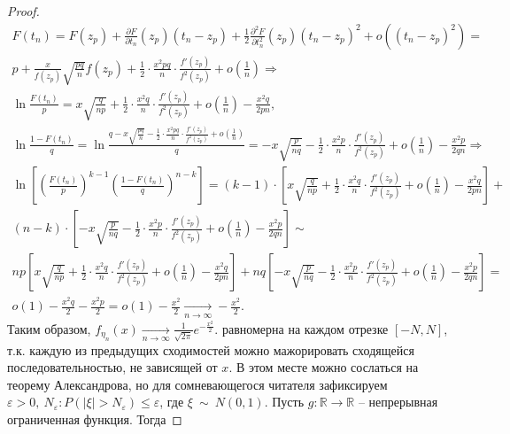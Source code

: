 \begin{proof}
\begin{gather*}
F( t_{n}) =F( z_{p}) +\frac{\partial F}{\partial t_{n}}( z_{p})( t_{n} -z_{p}) +\frac{1}{2}\frac{\partial ^{2} F}{\partial t_{n}^{2}}( z_{p})( t_{n} -z_{p})^{2} +o\left(( t_{n} -z_{p})^{2}\right) =\\ p+\frac{x}{f( z_{p})}\sqrt{\frac{pq}{n}} f( z_{p}) +\frac{1}{2} \cdotp \frac{x^{2} pq}{n} \cdotp \frac{f'( z_{p})}{f^{2}( z_{p})} +o\left(\frac{1}{n}\right) \Rightarrow \\
\ln\frac{F( t_{n})}{p} =x\sqrt{\frac{q}{np}} +\frac{1}{2} \cdotp \frac{x^{2} q}{n} \cdotp \frac{f'( z_{p})}{f^{2}( z_{p})} +o\left(\frac{1}{n}\right) -\frac{x^{2} q}{2pn} ,\\
\ln\frac{1-F( t_{n})}{q} =\ln\frac{q-x\sqrt{\frac{pq}{n}} -\frac{1}{2} \cdotp \frac{x^{2} pq}{n} \cdotp \frac{f'( z_{p})}{f^{2}( z_{p})} +o\left(\frac{1}{n}\right)}{q} =-x\sqrt{\frac{p}{nq}} -\frac{1}{2} \cdotp \frac{x^{2} p}{n} \cdotp \frac{f'( z_{p})}{f^{2}( z_{p})} +o\left(\frac{1}{n}\right) -\frac{x^{2} p}{2qn} \Rightarrow \\
\ln\left[\left(\frac{F( t_{n})}{p}\right)^{k-1}\left(\frac{1-F( t_{n})}{q}\right)^{n-k}\right] =( k-1) \cdotp \left[ x\sqrt{\frac{q}{np}} +\frac{1}{2} \cdotp \frac{x^{2} q}{n} \cdotp \frac{f'( z_{p})}{f^{2}( z_{p})} +o\left(\frac{1}{n}\right) -\frac{x^{2} q}{2pn}\right] +\\ ( n-k) \cdotp \left[ -x\sqrt{\frac{p}{nq}} -\frac{1}{2} \cdotp \frac{x^{2} p}{n} \cdotp \frac{f'( z_{p})}{f^{2}( z_{p})} +o\left(\frac{1}{n}\right) -\frac{x^{2} p}{2qn}\right]\sim\\ np\left[ x\sqrt{\frac{q}{np}} +\frac{1}{2} \cdotp \frac{x^{2} q}{n} \cdotp \frac{f'( z_{p})}{f^{2}( z_{p})} +o\left(\frac{1}{n}\right) -\frac{x^{2} q}{2pn}\right] +nq\left[ -x\sqrt{\frac{p}{nq}} -\frac{1}{2} \cdotp \frac{x^{2} p}{n} \cdotp \frac{f'( z_{p})}{f^{2}( z_{p})} +o\left(\frac{1}{n}\right) -\frac{x^{2} p}{2qn}\right] =\\ o( 1) -\frac{x^{2} q}{2} -\frac{x^{2} p}{2} =o( 1) -\frac{x^{2}}{2}\xrightarrow[n\rightarrow \infty ]{} -\frac{x^{2}}{2} .
\end{gather*}
Таким образом, $\displaystyle f_{\eta _{n}}( x)\xrightarrow[n\rightarrow \infty ]{}\frac{1}{\sqrt{2\pi }} e^{-\frac{x^{2}}{2}}$. равномерна на каждом отрезке $\displaystyle [ -N,N]$, т.к. каждую из предыдущих сходимостей можно мажорировать сходящейся последовательностью, не зависящей от $\displaystyle x$. В этом месте можно сослаться на теорему Александрова, но для сомневающегося читателя зафиксируем $\displaystyle \varepsilon  >0,\ N_{\varepsilon } :P(| \xi |  >N_{\varepsilon }) \leqslant \varepsilon $, где $\displaystyle \xi \ \sim \ N( 0,1)$. Пусть $\displaystyle g:\mathbb{R}\rightarrow \mathbb{R}$ -- непрерывная ограниченная функция. Тогда



\end{proof}
